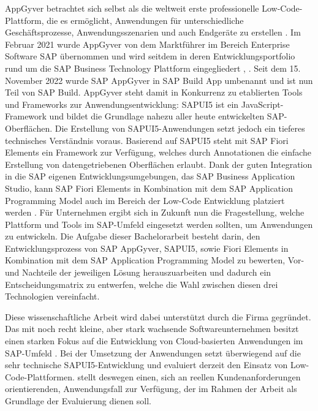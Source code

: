 AppGyver betrachtet sich selbst als die weltweit erste professionelle Low-Code-Plattform, die es ermöglicht, Anwendungen für unterschiedliche Geschäftsprozesse, Anwendungsszenarien und auch Endgeräte zu erstellen \cite{lcnc:appgyv}. Im Februar 2021 wurde AppGyver von dem Marktführer im Bereich Enterprise Software SAP übernommen und wird seitdem in deren Entwicklungsportfolio rund um die SAP Business Technology Plattform eingegliedert \cite{lcnc:ncp}, \cite{lcnc:appgyvint}. Seit dem 15. November 2022 wurde SAP AppGyver in SAP Build App umbenannt und ist nun Teil von SAP Build. AppGyver steht damit in Konkurrenz zu etablierten Tools und Frameworks zur Anwendungsentwicklung: SAPUI5 ist ein JavaScript-Framework und bildet die Grundlage nahezu aller heute entwickelten SAP-Oberflächen. Die Erstellung von SAPUI5-Anwendungen setzt jedoch ein tieferes technisches Verständnis voraus. Basierend auf SAPUI5 steht mit SAP Fiori Elements ein Framework zur Verfügung, welches durch Annotationen die einfache Erstellung von datengetriebenen Oberflächen erlaubt. Dank der guten Integration in die SAP eigenen Entwicklungsumgebungen, das SAP Business Application Studio, kann SAP Fiori Elements in Kombination mit dem SAP Application Programming Model auch im Bereich der Low-Code Entwicklung platziert werden \cite{lcnc:fiori}. Für Unternehmen ergibt sich in Zukunft nun die Fragestellung, welche Plattform und Tools im SAP-Umfeld eingesetzt werden sollten, um Anwendungen zu entwickeln. Die Aufgabe dieser Bachelorarbeit besteht darin, den Entwicklungsprozess von SAP AppGyver, SAPUI5, sowie Fiori Elements in Kombination mit dem SAP Application Programming Model zu bewerten, Vor- und Nachteile der jeweiligen Lösung herauszuarbeiten und dadurch ein Entscheidungsmatrix zu entwerfen, welche die Wahl zwischen diesen drei Technologien vereinfacht.

Diese wissenschaftliche Arbeit wird dabei unterstützt durch die Firma  gegründet. Das mit  noch recht kleine, aber stark wachsende Softwareunternehmen besitzt einen starken Fokus auf die Entwicklung von Cloud-basierten Anwendungen im SAP-Umfeld \cite{lcnc:p36}.  Bei der Umsetzung der Anwendungen setzt  überwiegend auf die sehr technische SAPUI5-Entwicklung und evaluiert derzeit den Einsatz von Low-Code-Plattformen.  stellt deswegen einen, sich an reellen Kundenanforderungen orientierenden, Anwendungsfall zur Verfügung, der im Rahmen der Arbeit als Grundlage der Evaluierung dienen soll. 

